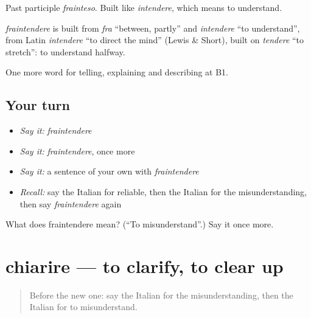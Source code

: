 Past participle \emph{frainteso}. Built like \emph{intendere}, which means to understand.

\begin{cousinweb}
\emph{fraintendere} is built from \emph{fra} \textquotedblleft{}between, partly\textquotedblright{} and \emph{intendere} \textquotedblleft{}to understand\textquotedblright{}, from Latin \emph{intendere} \textquotedblleft{}to direct the mind\textquotedblright{} (Lewis \& Short), built on \emph{tendere} \textquotedblleft{}to stretch\textquotedblright{}: to understand halfway.
\end{cousinweb}

\begin{grammarlens}[title={What you've built}]
One more word for telling, explaining and describing at B1.
\end{grammarlens}

\subsection*{Your turn}
\begin{itemize}
\raggedright
  \item \emph{Say it:} \emph{fraintendere}
  \item \emph{Say it:} \emph{fraintendere}, once more
  \item \emph{Say it:} a sentence of your own with \emph{fraintendere}
  \item \emph{Recall:} say the Italian for reliable, then the Italian for the misunderstanding, then say \emph{fraintendere} again
\end{itemize}

\begin{tcolorbox}[breakable,colback=teal!4,colframe=teal!35!black,title={Before you move on}]
What does fraintendere mean? (\textquotedblleft{}To misunderstand\textquotedblright{}.) Say it once more.
\end{tcolorbox}
\section[chiarire]{chiarire — to clarify, to clear up}

\label{lesson:IT-C346-chiarire}



\begin{quote}
Before the new one: say the Italian for the misunderstanding, then the Italian for to misunderstand.
\end{quote}

